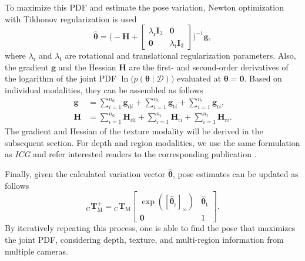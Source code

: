 \documentclass[letterpaper, 10 pt, conference]{ieeeconf}
\begin{document}
To maximize this \ac{PDF} and estimate the pose variation, Newton optimization with Tikhonov regularization is used
\begin{equation}\label{eq:c11}
	\pmb{\hat{\theta}} = \bigg(-\pmb{H} + 
	\begin{bmatrix}
		\lambda_\textrm{r} \pmb{I}_3 & \pmb{0}\\
		\pmb{0} & \lambda_\textrm{t} \pmb{I}_3
	\end{bmatrix}
	\bigg)^{-1}\pmb{g},
\end{equation}
where $\lambda_\textrm{r}$ and $\lambda_\textrm{t}$ are rotational and translational regularization parameters.
Also, the gradient $\pmb{g}$ and the Hessian $\pmb{H}$ are the first- and second-order derivatives of the logarithm of the joint \ac{PDF} $\ln\big(p(\pmb{\theta}\mid\pmb{\mathcal{D}})\big)$ evaluated at $\pmb{\theta} = \pmb{0}$.
Based on individual modalities, they can be assembled as follows
\begin{align}\label{eq:c12}
	\pmb{g} &= \sum_{i=1}^{n_\textrm{d}} \pmb{g}_{\textrm{d}i} + \sum_{i=1}^{n_\textrm{t}} \pmb{g}_{\textrm{t}i} + \sum_{i=1}^{n_\textrm{r}} \pmb{g}_{\textrm{r}i},\\[5pt]\label{eq:mmt:c13}
	\pmb{H} &= \sum_{i=1}^{n_\textrm{d}} \pmb{H}_{\textrm{d}i} + \sum_{i=1}^{n_\textrm{t}} \pmb{H}_{\textrm{t}i} + \sum_{i=1}^{n_\textrm{r}} \pmb{H}_{\textrm{r}i}.
\end{align}
The gradient and Hessian of the texture modality will be derived in the subsequent section.
For depth and region modalities, we use the same formulation as \textit{ICG} and refer interested readers to the corresponding publication \cite{Stoiber2022}.

Finally, given the calculated variation vector $\pmb{\hat{\theta}}$, pose estimates can be updated as follows
\begin{equation}\label{eq:c14}
	_\textrm{C}\pmb{T}_\textrm{M}^+ =
	{}_\textrm{C}\pmb{T}_\textrm{M}
	\begin{bmatrix}
		\exp([\pmb{\hat{\theta}}_\textrm{r}]_\times) & \pmb{\hat{\theta}}_\textrm{t} \\ \pmb{0} & 1
	\end{bmatrix}.
\end{equation}
By iteratively repeating this process, one is able to find the pose that maximizes the joint \ac{PDF}, considering depth, texture, and multi-region information from multiple cameras.
\end{document}
